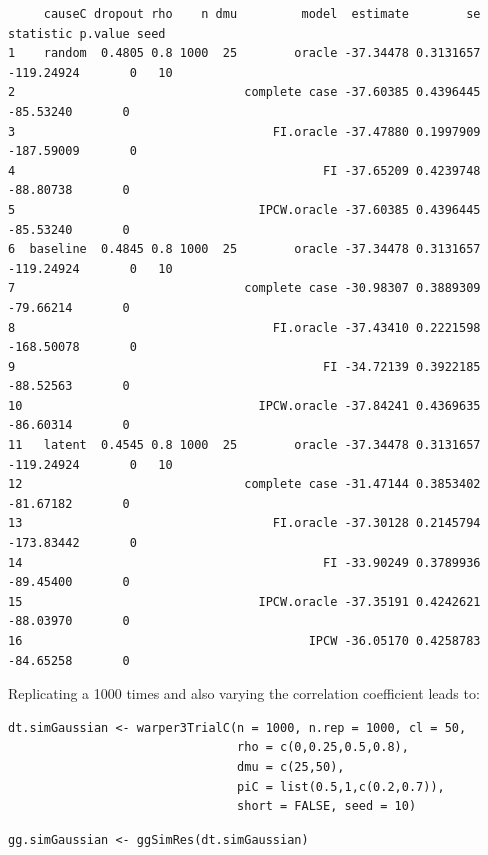 \documentclass[12pt]{article}
\begin{document}
\begin{verbatim}
     causeC dropout rho    n dmu         model  estimate        se  statistic p.value seed
1    random  0.4805 0.8 1000  25        oracle -37.34478 0.3131657 -119.24924       0   10
2                                complete case -37.60385 0.4396445  -85.53240       0     
3                                    FI.oracle -37.47880 0.1997909 -187.59009       0     
4                                           FI -37.65209 0.4239748  -88.80738       0     
5                                  IPCW.oracle -37.60385 0.4396445  -85.53240       0     
6  baseline  0.4845 0.8 1000  25        oracle -37.34478 0.3131657 -119.24924       0   10
7                                complete case -30.98307 0.3889309  -79.66214       0     
8                                    FI.oracle -37.43410 0.2221598 -168.50078       0     
9                                           FI -34.72139 0.3922185  -88.52563       0     
10                                 IPCW.oracle -37.84241 0.4369635  -86.60314       0     
11   latent  0.4545 0.8 1000  25        oracle -37.34478 0.3131657 -119.24924       0   10
12                               complete case -31.47144 0.3853402  -81.67182       0     
13                                   FI.oracle -37.30128 0.2145794 -173.83442       0     
14                                          FI -33.90249 0.3789936  -89.45400       0     
15                                 IPCW.oracle -37.35191 0.4242621  -88.03970       0     
16                                        IPCW -36.05170 0.4258783  -84.65258       0
\end{verbatim}

Replicating a 1000 times and also varying the correlation coefficient leads to:
\lstset{language=r,label= ,caption= ,captionpos=b,numbers=none}
\begin{lstlisting}
dt.simGaussian <- warper3TrialC(n = 1000, n.rep = 1000, cl = 50,
                                rho = c(0,0.25,0.5,0.8),
                                dmu = c(25,50),
                                piC = list(0.5,1,c(0.2,0.7)),
                                short = FALSE, seed = 10)
\end{lstlisting}

\clearpage

\lstset{language=r,label= ,caption= ,captionpos=b,numbers=none}
\begin{lstlisting}
gg.simGaussian <- ggSimRes(dt.simGaussian)
\end{lstlisting}
\end{document}

